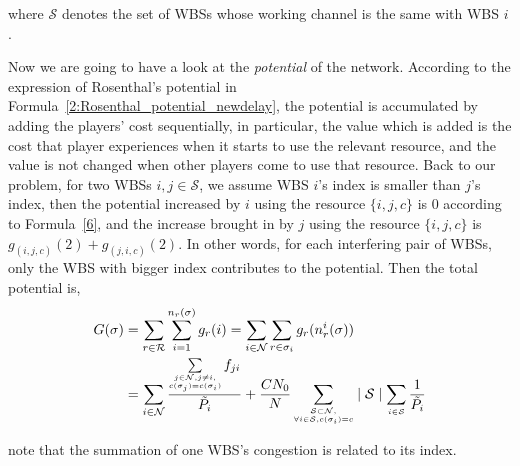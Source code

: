 where $\mathcal{S}$ denotes the set of WBSs whose working channel is the same with WBS $i$.

Now we are going to have a look at the \textit{potential} of the network.
According to the expression of Rosenthal's potential in Formula~\ref{2:Rosenthal_potential_newdelay}, the potential is accumulated by adding the players' cost sequentially, in particular, the value which is added is the cost that player experiences when it starts to use the relevant resource, and the value is not changed when other players come to use that resource.
Back to our problem, for two WBSs $i,j\in \mathcal{S}$, we assume WBS $i$'s index is smaller than $j$'s index, then the potential increased by $i$ using the resource $\{i,j,c\}$ is 0 according to Formula~\ref{6}, and the increase brought in by $j$ using the resource $\{i,j,c\}$ is $g_{(i,j,c)}(2)+g_{(j,i,c)}(2)$. 
In other words, for each interfering pair of WBSs, only the WBS with bigger index contributes to the potential. 
Then the total potential is, 
\begin{equation}
\label{allPotential}
\begin{split}	
G(\sigma) 
& =\sum\limits^{}_{r\in \mathcal{R}} \sum\limits^{n_r(\sigma)}_{i=1} g_r(i)  =\sum\limits_{i\in \mathcal{N}} \sum\limits^{}_{r\in \sigma_i} g_r(n_r^i(\sigma))\\
& = \sum\limits_{i\in \mathcal{N}}\dfrac{\sum\limits_{\tiny\substack{j\in \mathcal{N}, j\ne i,\\ c(\sigma_j)=c(\sigma_i)}}f_{ji}}{\tilde{P_i}} + \dfrac{CN_0}{N}\sum\limits_{\tiny\substack{\mathcal{S}\subset \mathcal{N},\\ \forall i\in \mathcal{S}, c(\sigma_i)=c}} \mid \mathcal{S}\mid   \sum\limits_{\tiny\substack{i\in \mathcal{S}}}\frac{1}{\tilde{P_i}}
\end{split}
\end{equation}

 note that the summation of one WBS's congestion is related to its index. 

%

